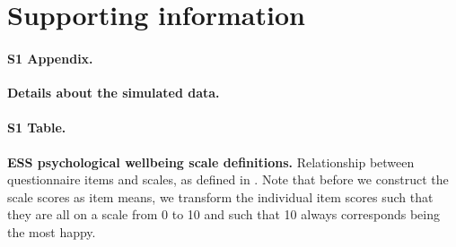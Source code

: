 \documentclass[a4paper,14pt]{article}
\begin{document}
\section*{Supporting information}


\paragraph*{S1 Appendix.}
\label{appendix.simData}
{\bf Details about the simulated data.}


\paragraph*{S1 Table.}
\label{table:items}
{\bf ESS psychological wellbeing scale definitions.} Relationship between questionnaire items and scales, as defined in \cite{ESStopline5}. Note that before we construct the scale scores as item means, we transform the individual item scores such that they are all on a scale from 0 to 10 and such that 10 always corresponds being the most happy.


\newpage



\end{document}
